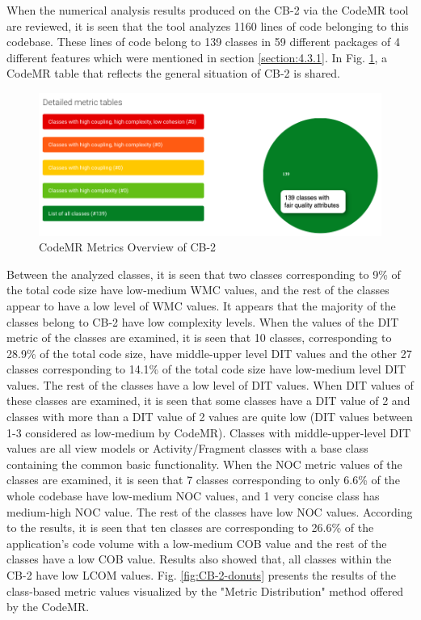 When the numerical analysis results produced on the CB-2 via the CodeMR tool are reviewed, it is seen that the tool analyzes 1160 lines of code belonging to this codebase. These lines of code belong to 139 classes in 59 different packages of 4 different features which were mentioned in section \ref{section:4.3.1}. In Fig. \ref{fig:CB-2-metric-table.png}, a CodeMR table that reflects the general situation of CB-2 is shared.
\begin{figure}[ht!]
    \centering
    \includegraphics[scale=0.45]{figures/CB-2-metric-table.png}
    \caption{CodeMR Metrics Overview of CB-2}
    \label{fig:CB-2-metric-table.png}
\end{figure}
\FloatBarrier

Between the analyzed classes, it is seen that two classes corresponding to 9\% of the total code size have low-medium WMC values, and the rest of the classes appear to have a low level of WMC values. It appears that the majority of the classes belong to CB-2 have low complexity levels. When the values of the DIT metric of the classes are examined, it is seen that 10 classes, corresponding to 28.9\% of the total code size, have middle-upper level DIT values and the other 27 classes corresponding to 14.1\% of the total code size have low-medium level DIT values. The rest of the classes have a low level of DIT values.  When DIT values of these classes are examined, it is seen that some classes have a DIT value of 2 and classes with more than a DIT value of 2 values are quite low (DIT values between 1-3 considered as low-medium by CodeMR). Classes with middle-upper-level DIT values are all view models or Activity/Fragment classes with a base class containing the common basic functionality. When the NOC metric values of the classes are examined, it is seen that 7 classes corresponding to only 6.6\% of the whole codebase have low-medium NOC values, and 1 very concise class has medium-high NOC value. The rest of the classes have low NOC values. According to the results, it is seen that ten classes are corresponding to 26.6\% of the application's code volume with a low-medium COB value and the rest of the classes have a low COB value. Results also showed that, all classes within the CB-2 have low LCOM values. Fig. \ref{fig:CB-2-donuts} presents the results of the class-based metric values visualized by the "Metric Distribution" method offered by the CodeMR.

